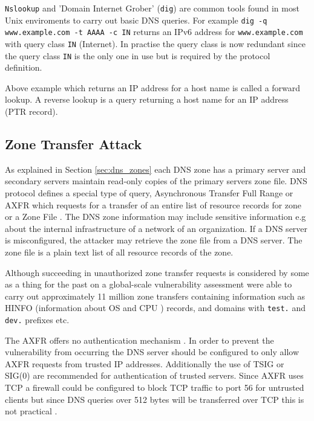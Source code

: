\texttt{Nslookup} and 'Domain Internet Grober' (\texttt{dig}) are common tools found in most Unix enviroments to carry out basic DNS queries. For example \texttt{dig -q www.example.com -t AAAA -c IN} returns an IPv6 address for \texttt{www.example.com} with query class \texttt{IN} (Internet). In practise the query class is now redundant since the query class \texttt{IN} is the only one in use but is required by the protocol definition.

Above example which returns an IP address for a host name is called a forward lookup. A reverse lookup is a query returning a host name for an IP address (PTR record).

\subsection{Zone Transfer Attack}

As explained in Section \ref{sec:dns_zones} each DNS zone has a primary server and secondary servers maintain read-only copies of the primary servers zone file. DNS protocol defines a special type of query, Asynchronous Transfer Full Range or AXFR which requests for a transfer of an entire list of resource records for zone or a Zone File \cite{RFC1034}. The DNS zone information may include sensitive information e.g about the internal infrastructure of a network of an organization. If a DNS server is misconfigured, the attacker may retrieve the zone file from a DNS server. The zone file is a plain text list of all resource records of the zone.

Although succeeding in unauthorized zone transfer requests is considered by some as a thing for the past \cite{network_sec_assessment} on a global-scale vulnerability assessment  \citet{global_zone_transfer} were able to carry out approximately 11 million zone transfers containing information such as HINFO (information about OS and CPU \cite{RFC1035}) records, and domains with \texttt{test.} and \texttt{dev.} prefixes etc.

The AXFR offers no authentication mechanism \cite{RFC1035}\cite{RFC5936}. In order to prevent the vulnerability from occurring the DNS server should be configured to only allow AXFR requests from trusted IP addresses. Additionally the use of TSIG or SIG(0) are recommended for authentication of trusted servers\cite{RFC5936}. Since AXFR uses TCP \cite{RFC1034}\cite{RFC1035} a firewall could be configured to block TCP traffic to port 56 for untrusted clients but since DNS queries over 512 bytes will be transferred over TCP this is not practical \cite{hacking_exposed}.


